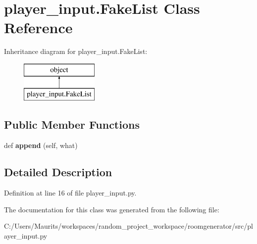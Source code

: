 \hypertarget{classplayer__input_1_1_fake_list}{}\section{player\+\_\+input.\+Fake\+List Class Reference}
\label{classplayer__input_1_1_fake_list}
Inheritance diagram for player\+\_\+input.\+Fake\+List\+:\begin{figure}[H]
\begin{center}
\leavevmode
\includegraphics[height=2.000000cm]{classplayer__input_1_1_fake_list}
\end{center}
\end{figure}
\subsection*{Public Member Functions}
\begin{DoxyCompactItemize}
\item 
\hypertarget{classplayer__input_1_1_fake_list_ade57bb284f7202aad2e574871f1f74c2}{}def {\bfseries append} (self, what)\label{classplayer__input_1_1_fake_list_ade57bb284f7202aad2e574871f1f74c2}

\end{DoxyCompactItemize}


\subsection{Detailed Description}


Definition at line 16 of file player\+\_\+input.\+py.



The documentation for this class was generated from the following file\+:\begin{DoxyCompactItemize}
\item 
C\+:/\+Users/\+Maurits/workspaces/random\+\_\+project\+\_\+workspace/roomgenerator/src/player\+\_\+input.\+py\end{DoxyCompactItemize}
